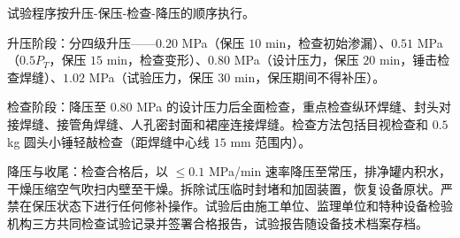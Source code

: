 试验程序按升压-保压-检查-降压的顺序执行。

升压阶段：分四级升压——$0.20$ MPa（保压 $10$ min，检查初始渗漏）、$0.51$ MPa（$0.5P_T$，保压 $15$ min，检查变形）、$0.80$ MPa（设计压力，保压 $20$ min，锤击检查焊缝）、$1.02$ MPa（试验压力，保压 $30$ min，保压期间不得补压）。

检查阶段：降压至 $0.80$ MPa 的设计压力后全面检查，重点检查纵环焊缝、封头对接焊缝、接管角焊缝、人孔密封面和裙座连接焊缝。检查方法包括目视检查和 $0.5$ kg 圆头小锤轻敲检查（距焊缝中心线 $15$ mm 范围内）。

降压与收尾：检查合格后，以 $\le 0.1$ MPa/min 速率降压至常压，排净罐内积水，干燥压缩空气吹扫内壁至干燥。拆除试压临时封堵和加固装置，恢复设备原状。严禁在保压状态下进行任何修补操作。试验后由施工单位、监理单位和特种设备检验机构三方共同检查试验记录并签署合格报告，试验报告随设备技术档案存档。
